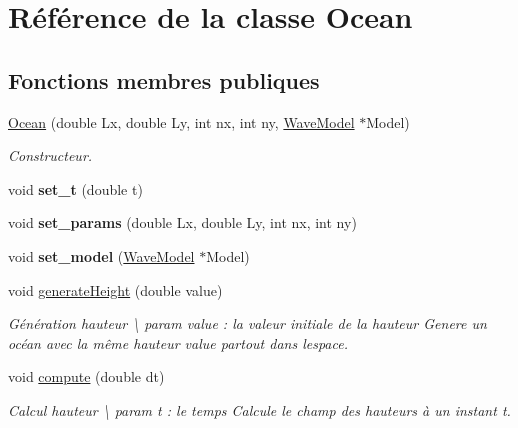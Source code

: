 \hypertarget{class_ocean}{}\section{Référence de la classe Ocean}
\label{class_ocean}
\subsection*{Fonctions membres publiques}
\begin{DoxyCompactItemize}
\item 
\hyperlink{class_ocean_a5bf2686e16107378f2a934941ea3a085}{Ocean} (double Lx, double Ly, int nx, int ny, \hyperlink{class_wave_model}{Wave\+Model} $\ast$Model)
\begin{DoxyCompactList}\small\item\em Constructeur. \end{DoxyCompactList}\item 
\mbox{\label{class_ocean_aeecea110bc6527de046f41c94a3c0a83}} 
void {\bfseries set\+\_\+t} (double t)
\item 
\mbox{\label{class_ocean_aaa44e553e45f6c7f1cbc9c005068655f}} 
void {\bfseries set\+\_\+params} (double Lx, double Ly, int nx, int ny)
\item 
\mbox{\label{class_ocean_afc6a1506cf7c4f663ad34fff663febd0}} 
void {\bfseries set\+\_\+model} (\hyperlink{class_wave_model}{Wave\+Model} $\ast$Model)
\item 
\mbox{\label{class_ocean_ac78947768292df75ce929d4845123d01}} 
void \hyperlink{class_ocean_ac78947768292df75ce929d4845123d01}{generate\+Height} (double value)
\begin{DoxyCompactList}\small\item\em Génération hauteur \textbackslash{} param value \+: la valeur initiale de la hauteur Genere un océan avec la même hauteur value partout dans l\textquotesingle{}espace. \end{DoxyCompactList}\item 
\mbox{\label{class_ocean_af9522ffea1611cd52b6161003b43bb4f}} 
void \hyperlink{class_ocean_af9522ffea1611cd52b6161003b43bb4f}{compute} (double dt)
\begin{DoxyCompactList}\small\item\em Calcul hauteur \textbackslash{} param t \+: le temps Calcule le champ des hauteurs à un instant t. \end{DoxyCompactList}\item 

\end{DoxyCompactItemize}
